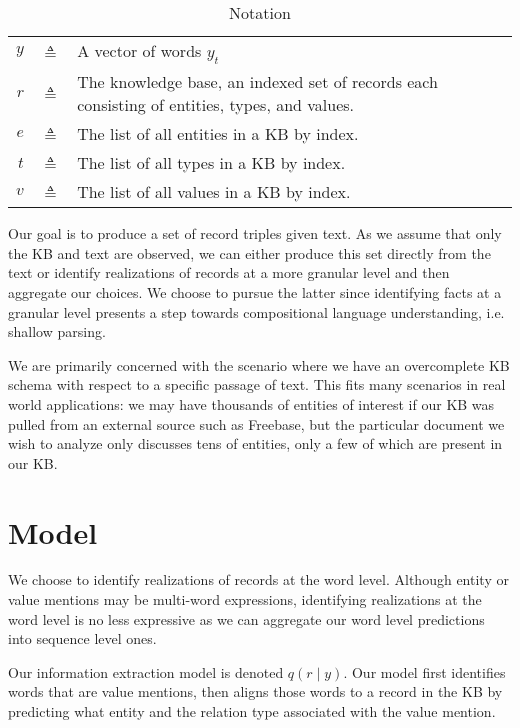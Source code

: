 \documentclass[12pt]{article}
\begin{document}
\begin{table}[htbp]\caption{Notation}
\centering %
\begin{tabular}{r c p{10cm} }
\toprule
$y$ & $\triangleq$ & A vector of words $y_t$\\
$r$ & $\triangleq$ & The knowledge base,
    an indexed set of records each consisting of entities, types, and values.\\
$e$ & $\triangleq$ & The list of all entities in a KB by index.\\
$t$ & $\triangleq$ & The list of all types in a KB by index.\\
$v$ & $\triangleq$ & The list of all values in a KB by index.\\
\bottomrule
\end{tabular}
\label{tab:TableOfNotationForMyResearch}
\end{table}

Our goal is to produce a set of record triples given text.
As we assume that only the KB and text are observed,
we can either produce this set directly from the text or identify realizations of
records at a more granular level and then aggregate our choices.
We choose to pursue the latter since identifying facts at a granular level
presents a step towards compositional language understanding,
i.e. shallow parsing.

We are primarily concerned with the scenario where we have an overcomplete KB schema with
respect to a specific passage of text.
This fits many scenarios in real world applications:
we may have thousands of entities of interest if our KB was pulled from an 
external source such as Freebase,
but the particular document we wish to analyze only discusses tens of entities,
only a few of which are present in our KB.

\section{Model}
We choose to identify realizations of records at the word level.
Although entity or value mentions may be multi-word expressions,
identifying realizations at the word level is no less expressive as
we can aggregate our word level predictions into sequence level ones.

Our information extraction model is denoted $q(r \mid y)$.
Our model first identifies words that are value mentions,
then aligns those words to a record in the KB by predicting what
entity and the relation type associated with the value mention.
\end{document}
